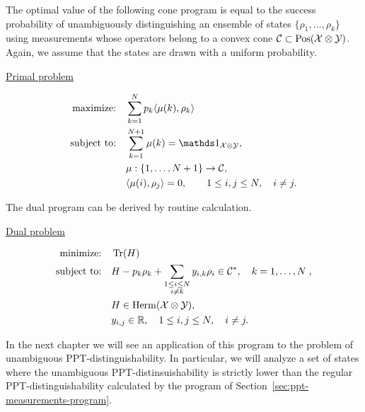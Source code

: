 The optimal value of the following cone program is equal to the success 
probability of unambiguously distinguishing an ensemble of states 
$\{ \rho_{1}, \ldots, \rho_{k} \}$ using measurements whose operators belong
to a convex cone $\mathcal{C} \subset \mathrm{Pos}(\mathcal{X}\otimes\mathcal{Y})$.
Again, we assume that the states are drawn with a uniform probability.
\begin{center}
    \centerline{\underline{Primal problem}}\vspace{-4mm}
    \begin{align}
      \text{maximize:}\quad & \sum_{k = 1}^N p_{k}\ip{\mu(k)}{\rho_{k}}\notag\\
      \text{subject to:}\quad & \sum_{k=1}^{N+1} \mu(k)= \I_{\X\otimes\Y}, \label{sdp-primal-unambiguous}\\
      & \mu : \{1, \ldots, N+1\} \rightarrow \C, \notag\\
      & \ip{\mu(i)}{\rho_{j}} = 0, \qquad 1 \leq i,j \leq N, \quad i \neq j. \notag
    \end{align}
\end{center}
The dual program can be derived by routine calculation.
\begin{center}
    \centerline{\underline{Dual problem}}\vspace{-4mm}
    \begin{align}
      \text{minimize:}\quad & \operatorname{Tr}(H)\notag\\
      \text{subject to:}\quad & H - p_{k}\rho_{k} + \sum_{\substack{1\leq i \leq N \\ i\neq k}}
          y_{i,k}\rho_{i} \in \mathcal{C}^{\ast}, \quad k=1,\ldots,N \; ,\label{sdp-dual-unambiguous}\\
      & H \in \mathrm{Herm}(\mathcal{X}\otimes\mathcal{Y}),\notag\\
      & y_{i,j} \in \mathbb{R}, \quad 1 \leq i,j \leq N, \quad i \neq j.\notag
    \end{align}
\end{center}
In the next chapter we will see an application of this program to the problem of 
unambiguous PPT-distinguishability. In particular, we will analyze a set of states where 
the unambiguous PPT-distinsuishability is strictly lower than the regular 
PPT-distinguishability calculated by the program of Section~\ref{sec:ppt-measurements-program}. 